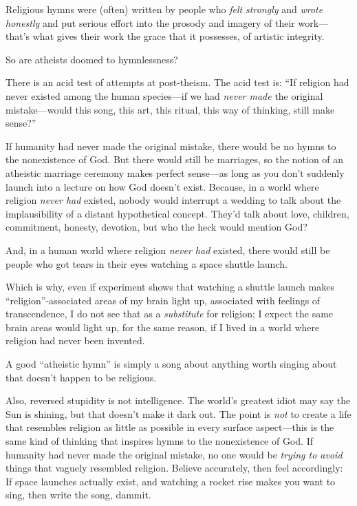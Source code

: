 {
 Religious hymns were (often) written by people who \textit{felt
strongly} and \textit{wrote honestly} and put serious effort into the
prosody and imagery of their work---that's what gives
their work the grace that it possesses, of artistic integrity.}

{
 So are atheists doomed to hymnlessness?}

{
 There is an acid test of attempts at post-theism. The acid test
is: ``If religion had never existed among the human
species---if we had \textit{never made} the original mistake---would
this song, this art, this ritual, this way of thinking, still make
sense?''}

{
 If humanity had never made the original mistake, there would be no
hymns to the nonexistence of God. But there would still be marriages,
so the notion of an atheistic marriage ceremony makes perfect
sense---as long as you don't suddenly launch into a
lecture on how God doesn't exist. Because, in a world
where religion \textit{never had} existed, nobody would interrupt a
wedding to talk about the implausibility of a distant hypothetical
concept. They'd talk about love, children, commitment,
honesty, devotion, but who the heck would mention God?}

{
 And, in a human world where religion \textit{never had} existed,
there would still be people who got tears in their eyes watching a
space shuttle launch.}

{
 Which is why, even if experiment shows that watching a shuttle
launch makes ``religion''-associated
areas of my brain light up, associated with feelings of transcendence,
I do not see that as a \textit{substitute} for religion; I expect the
same brain areas would light up, for the same reason, if I lived in a
world where religion had never been invented.}

{
 A good ``atheistic hymn'' is
simply a song about anything worth singing about that
doesn't happen to be religious.}

{
 Also, reversed stupidity is not intelligence. The
world's greatest idiot may say the Sun is shining, but
that doesn't make it dark out. The point is
\textit{not} to create a life that resembles religion as little as
possible in every surface aspect---this is the same kind of thinking
that inspires hymns to the nonexistence of God. If humanity had never
made the original mistake, no one would be \textit{trying to avoid}
things that vaguely resembled religion. Believe accurately, then feel
accordingly: If space launches actually exist, and watching a rocket
rise makes you want to sing, then write the song, dammit.}

